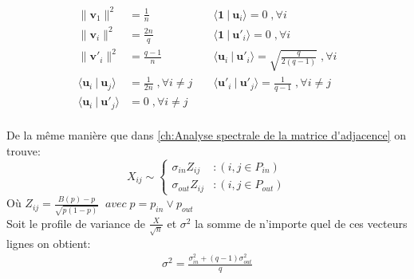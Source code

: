 \begin{align}\label{eq:norm generalize}
\parallel \mathbf{v}_1 \parallel^2 &= \frac{1}{n} & \; & \langle \mathbf{1}  \:|\: \mathbf{u}_i  \rangle = 0 \;,\forall i\nonumber\\
\parallel \mathbf{v}_i \parallel^2 &= \frac{2n}{q} & \; & \langle \mathbf{1} \:|\: \mathbf{u'}_i  \rangle = 0 \;,\forall i \\
\parallel \mathbf{v'}_i \parallel^2 &= \frac{q - 1}{n} & \; & \langle \mathbf{u}_i\:|\: \mathbf{u'}_i  \rangle = \sqrt{\frac{q}{2(q-1)}} \;,\forall i\nonumber\\
 \langle \mathbf{u}_i \:|\: \mathbf{u}_j  \rangle &= \frac{1}{2n} \;,\forall i \neq j & \; & \langle \mathbf{u'}_i \:|\: \mathbf{u'}_j  \rangle = \frac{1}{q - 1} \;,\forall i \neq j \nonumber\\
\langle \mathbf{u}_i \:|\: \mathbf{u'}_j  \rangle &= 0 \;,\forall i \neq j \nonumber
\end{align}\\

De la même manière que dans \autoref{ch:Analyse spectrale de la matrice d'adjacence} on trouve:
\begin{equation}
	X_{ij} \sim \left\{
	\begin{array}{lr}
		\sigma_{in} Z_{ij} & : (i,j \in P_{in}) \\
		\sigma_{out} Z_{ij} & : (i,j \in P_{out})
	\end{array}
\right.\nonumber
\end{equation}
Où $Z_{ij} = \frac{B(p) - p}{\sqrt{p(1-p)}} \;\;avec \; p = p_{in} \lor p_{out}$\\
Soit le profile de variance de $\frac{X}{\sqrt{n}}$ et $\sigma^2$ la somme de n'importe quel de ces vecteurs lignes on obtient: 
\begin{align}
\label{eq:sigma2} 
\sigma^2 = \frac{\sigma_{in}^2 + (q-1)\sigma_{out}^2}{q}
\end{align}\\

